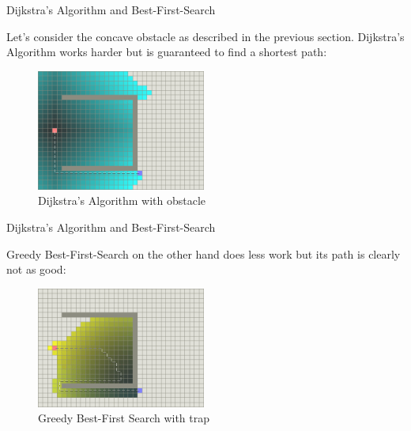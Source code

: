 \documentclass[ignorenonframetext,]{beamer}
\begin{document}
\begin{frame}{Dijkstra's Algorithm and Best-First-Search}
\protect\hypertarget{dijkstras-algorithm-and-best-first-search}{}

Let's consider the concave obstacle as described in the previous
section. Dijkstra's Algorithm works harder but is guaranteed to find a
shortest path:

\begin{figure}
\centering
\includegraphics[width=\textwidth,height=1.5625in]{dijkstra-trap.png}
\caption{Dijkstra's Algorithm with obstacle}
\end{figure}

\end{frame}

\begin{frame}{Dijkstra's Algorithm and Best-First-Search}
\protect\hypertarget{dijkstras-algorithm-and-best-first-search-1}{}

Greedy Best-First-Search on the other hand does less work but its path
is clearly not as good:

\begin{figure}
\centering
\includegraphics[width=\textwidth,height=1.5625in]{best-first-search-trap.png}
\caption{Greedy Best-First Search with trap}
\end{figure}

\end{frame}
\end{document}
